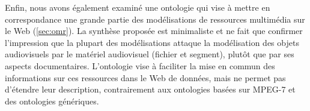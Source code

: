 Enfin, nous avons également examiné une ontologie qui vise à mettre en correspondance une grande partie des modélisations de ressources multimédia sur le Web (\ref{sec:omr}).
La synthèse proposée est minimaliste et ne fait que confirmer l'impression que la plupart des modélisations attaque la modélisation des objets audiovisuels par le matériel audiovisuel (fichier et segment), plutôt que par ses aspects documentaires.
L'ontologie vise à faciliter la mise en commun des informations sur ces ressources dans le Web de données, mais ne permet pas d'étendre leur description, contrairement aux ontologies basées sur MPEG-7 et des ontologies génériques.















